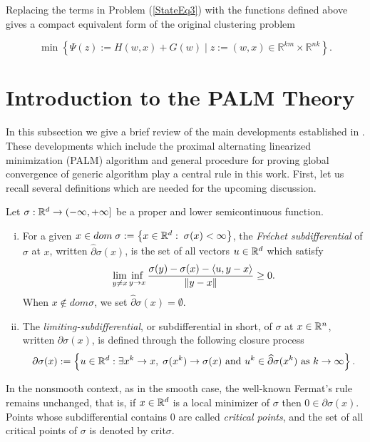 Replacing the terms in Problem (\ref{StateEq3}) with the functions defined above gives a compact equivalent form of the original clustering problem

\begin{equation}
	\min \left\lbrace \Psi(z) := H(w,x) + G(w) \mid z := (w,x) \in \mathbb{R}^{km} \times \mathbb{R}^{nk} \right\rbrace . \label{StateEq4}
\end{equation}

\section{Introduction to the PALM Theory} \label{State_PALM_Theory}

In this subsection we give a brief review of the main developments established in \cite
{BST2014}. These developments which include the proximal alternating linearized minimization (PALM) algorithm and general procedure for proving global convergence of generic algorithm play a central rule in this work. First, let us recall several definitions which are needed for the upcoming discussion.

\begin{definition}[Subdifferentials] \label{subdiff_def}
	Let $\sigma : \mathbb{R}^d \rightarrow (-\infty,+\infty]$ be a proper and lower semicontinuous function.
	\begin{enumerate}[(i)]
		\item For a given $x \in dom\;\sigma := \left\lbrace x \in \mathbb{R}^d : \; \sigma(x) < \infty \right\rbrace$, the \textit{Fr\'echet subdifferential} of $\sigma$ at $x$, written $\widehat{\partial}\sigma(x)$, is the set of all vectors $u \in \mathbb{R}^d$ which satisfy
		\begin{equation*}
			\lim\limits_{y \neq x} \inf\limits_{y \rightarrow x} \frac{\sigma(y) - \sigma(x) - \left\langle u, y-x \right\rangle}{\left\Vert {y-x} \right\Vert} \geq 0.
		\end{equation*}
		When $x \notin dom\sigma$, we set $\widehat{\partial}\sigma(x) = \emptyset$.
		\item The \textit{limiting-subdifferential}, or subdifferential in short, of $\sigma$ at $x \in \mathbb{R}^n$, written $\partial\sigma(x)$, is defined through the following closure process
		\begin{equation*}
			\partial\sigma(x) := \left\lbrace u \in \mathbb{R}^d : \exists x^k \rightarrow x, \; \sigma(x^k)\rightarrow \sigma(x) \text{ and } u^k \in \widehat{\partial}\sigma(x^k) \text{ as } k \rightarrow \infty \right\rbrace.
		\end{equation*}
	\end{enumerate}
\end{definition}
In the nonsmooth context, as in the smooth case, the well-known Fermat's rule remains unchanged, that is, if $x \in \mathbb{R}^d$ is a local minimizer of $\sigma$ then $0 \in \partial\sigma(x)$. Points whose subdifferential contains $0$ are called \textit{critical points}, and the set of all critical points of $\sigma$ is denoted by crit$\sigma$.

